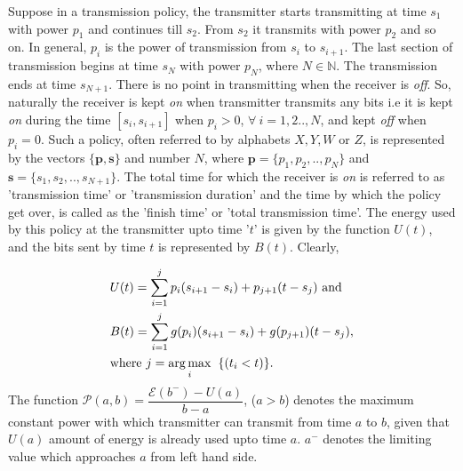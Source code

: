Suppose in a transmission policy, the transmitter starts transmitting at time $s_1$ with power $p_1$ and continues till $s_2$. From $s_2$ it transmits with power $p_2$ and so on. In general, $p_i$ is the power of transmission from $s_i$ to $s_{i+1}$. The last section of transmission begins at time $s_N$ with power $p_N$, where $N\in \mathbb{N}$. The transmission ends at time $s_{N+1}$. There is no point in transmitting when the receiver is \textit{off}. So, naturally the receiver is kept \textit{on} when transmitter transmits any bits i.e it is kept \textit{on} during the time $[s_i,s_{i+1}]$ when $p_i > 0$, $\forall \ i=1,2..,N$, and kept \textit{off} when $p_i=0$. Such a policy, often referred to by alphabets $X,Y,W$ or $Z$, is represented by the vectors $\{\bm{p},\bm{s}\}$ and number $N$, where $\bm{p}=\{p_1, p_2, .., p_N\}$ and $\bm{s}=\{s_1, s_2, .., s_{N+1}\}$. The total time for which the receiver is \textit{on} is referred to as 'transmission time' or 'transmission duration' and the time by which the policy get over, is called as the 'finish time' or 'total transmission time'. The energy used by this policy at the transmitter upto time '$t$' is given by the function $U(t)$, and the bits sent by time $t$ is represented by $B(t)$. Clearly,

\begin{align}
&U(t)=\sum_{i=1}^{j} p_i(s_{i+1}-s_i)+p_{j+1}(t-s_j) \text{ and }
\\
&B(t)=\sum_{i=1}^{j} g(p_i)(s_{i+1}-s_i)+g(p_{j+1})(t-s_j),
\\
&\text{where }j=\operatorname*{arg\,max}_{i} \hspace{2mm}\{(t_i<t)\}.\nonumber
\end{align}
The function $\mathcal{P}(a,b)=\dfrac{\mathcal{E}(b^- )-U(a)}{b-a}$,  ($a>b$) denotes the maximum constant power with which transmitter can transmit from time $a$ to $b$, given that $U(a)$ amount of energy is already used upto time $a$. $a^-$ denotes the limiting value which approaches $a$ from left hand side.

